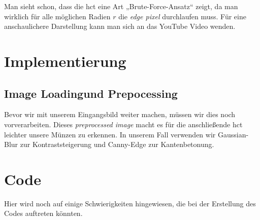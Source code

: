 \documentclass[12pt, a4paper]{scrartcl}
\begin{document}
Man sieht schon, dass die \acl{hct} eine Art „Brute-Force-Ansatz“ zeigt, da man wirklich für alle möglichen Radien \(r\) die \emph{edge pixel} durchlaufen muss. Für eine anschaulichere Darstellung kann man sich an das YouTube Video wenden.

\section{Implementierung}
\subsection{\glqq Image Loading\grqq und \glqq Prepocessing\grqq}
Bevor wir mit unserem Eingangsbild weiter machen, müssen wir dies noch vorverarbeiten. Dieses \emph{preprocessed image} macht es für die anschließende \acl{hct} leichter unsere Münzen zu erkennen. In unserem Fall verwenden wir Gaussian-Blur zur Kontraststeigerung und Canny-Edge zur Kantenbetonung.\newline


\section{Code}

Hier wird noch auf einige Schwierigkeiten hingewiesen, die bei der Erstellung des Codes auftreten könnten.
\end{document}
